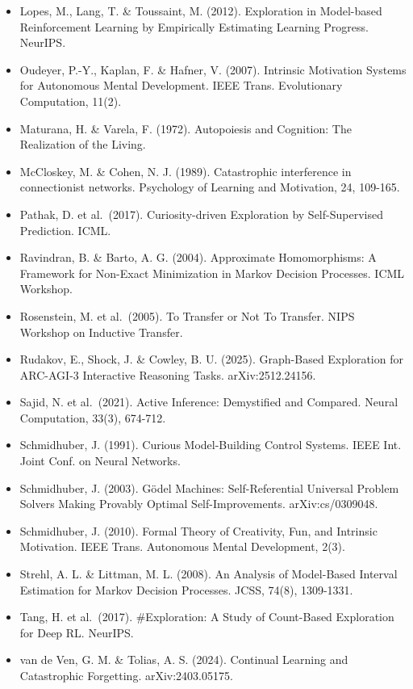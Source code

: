 \documentclass[
  11pt,
]{article}
\begin{document}
\begin{itemize}
  Springer.
\item
  Lopes, M., Lang, T. \& Toussaint, M. (2012). Exploration in
  Model-based Reinforcement Learning by Empirically Estimating Learning
  Progress. NeurIPS.
\item
  Oudeyer, P.-Y., Kaplan, F. \& Hafner, V. (2007). Intrinsic Motivation
  Systems for Autonomous Mental Development. IEEE Trans. Evolutionary
  Computation, 11(2).
\item
  Maturana, H. \& Varela, F. (1972). Autopoiesis and Cognition: The
  Realization of the Living.
\item
  McCloskey, M. \& Cohen, N. J. (1989). Catastrophic interference in
  connectionist networks. Psychology of Learning and Motivation, 24,
  109-165.
\item
  Pathak, D. et al.~(2017). Curiosity-driven Exploration by
  Self-Supervised Prediction. ICML.
\item
  Ravindran, B. \& Barto, A. G. (2004). Approximate Homomorphisms: A
  Framework for Non-Exact Minimization in Markov Decision Processes.
  ICML Workshop.
\item
  Rosenstein, M. et al.~(2005). To Transfer or Not To Transfer. NIPS
  Workshop on Inductive Transfer.
\item
  Rudakov, E., Shock, J. \& Cowley, B. U. (2025). Graph-Based
  Exploration for ARC-AGI-3 Interactive Reasoning Tasks.
  arXiv:2512.24156.
\item
  Sajid, N. et al.~(2021). Active Inference: Demystified and Compared.
  Neural Computation, 33(3), 674-712.
\item
  Schmidhuber, J. (1991). Curious Model-Building Control Systems. IEEE
  Int. Joint Conf. on Neural Networks.
\item
  Schmidhuber, J. (2003). Gödel Machines: Self-Referential Universal
  Problem Solvers Making Provably Optimal Self-Improvements.
  arXiv:cs/0309048.
\item
  Schmidhuber, J. (2010). Formal Theory of Creativity, Fun, and
  Intrinsic Motivation. IEEE Trans. Autonomous Mental Development, 2(3).
\item
  Strehl, A. L. \& Littman, M. L. (2008). An Analysis of Model-Based
  Interval Estimation for Markov Decision Processes. JCSS, 74(8),
  1309-1331.
\item
  Tang, H. et al.~(2017). \#Exploration: A Study of Count-Based
  Exploration for Deep RL. NeurIPS.
\item
  van de Ven, G. M. \& Tolias, A. S. (2024). Continual Learning and
  Catastrophic Forgetting. arXiv:2403.05175.

\end{itemize}
\end{document}
